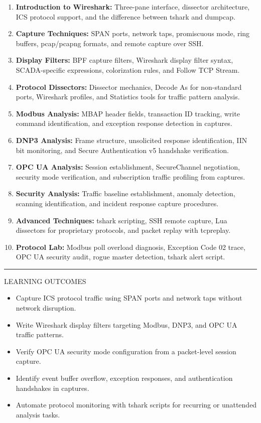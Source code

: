 \documentclass[10pt]{article}
\begin{document}
\begin{enumerate}\small
  \item \textbf{Introduction to Wireshark:} Three-pane interface, dissector architecture, ICS protocol support, and the difference between tshark and dumpcap.
  \item \textbf{Capture Techniques:} SPAN ports, network taps, promiscuous mode, ring buffers, pcap/pcapng formats, and remote capture over SSH.
  \item \textbf{Display Filters:} BPF capture filters, Wireshark display filter syntax, SCADA-specific expressions, colorization rules, and Follow TCP Stream.
  \item \textbf{Protocol Dissectors:} Dissector mechanics, Decode As for non-standard ports, Wireshark profiles, and Statistics tools for traffic pattern analysis.
  \item \textbf{Modbus Analysis:} MBAP header fields, transaction ID tracking, write command identification, and exception response detection in captures.
  \item \textbf{DNP3 Analysis:} Frame structure, unsolicited response identification, IIN bit monitoring, and Secure Authentication v5 handshake verification.
  \item \textbf{OPC UA Analysis:} Session establishment, SecureChannel negotiation, security mode verification, and subscription traffic profiling from captures.
  \item \textbf{Security Analysis:} Traffic baseline establishment, anomaly detection, scanning identification, and incident response capture procedures.
  \item \textbf{Advanced Techniques:} tshark scripting, SSH remote capture, Lua dissectors for proprietary protocols, and packet replay with tcpreplay.
  \item \textbf{Protocol Lab:} Modbus poll overload diagnosis, Exception Code 02 trace, OPC UA security audit, rogue master detection, tshark alert script.
\end{enumerate}

\smallskip
{\color{wnavy}\rule{\linewidth}{0.4pt}}
\smallskip
{\small\sffamily\color{wgray}\MakeUppercase{Learning Outcomes}}
\smallskip

\begin{itemize}\small
  \item Capture ICS protocol traffic using SPAN ports and network taps without network disruption.
  \item Write Wireshark display filters targeting Modbus, DNP3, and OPC UA traffic patterns.
  \item Verify OPC UA security mode configuration from a packet-level session capture.
  \item Identify event buffer overflow, exception responses, and authentication handshakes in captures.
  \item Automate protocol monitoring with tshark scripts for recurring or unattended analysis tasks.
\end{itemize}
\end{document}
